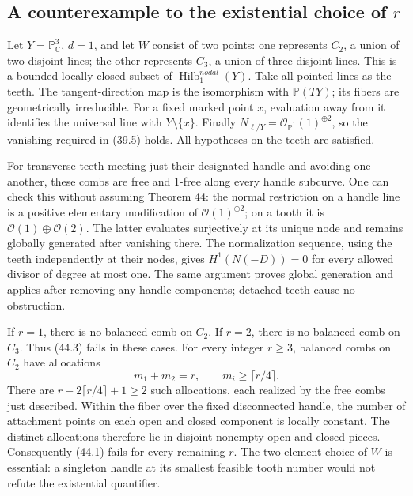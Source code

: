 \documentclass[10pt]{article}
\begin{document}
\subsection*{A counterexample to the existential choice of \(r\)}
Let \(Y=\mathbb P^3_{\mathbb C}\), \(d=1\), and let \(W\) consist of two points: one represents \(C_2\), a union of two disjoint lines; the other represents \(C_3\), a union of three disjoint lines. This is a bounded locally closed subset of \(\operatorname{Hilb}^{nodal}_1(Y)\). Take all pointed lines as the teeth. The tangent-direction map is the isomorphism with \(\mathbb P(TY)\); its fibers are geometrically irreducible. For a fixed marked point \(x\), evaluation away from it identifies the universal line with \(Y\setminus\{x\}\). Finally \(N_{\ell/Y}=\mathcal O_{\mathbb P^1}(1)^{\oplus2}\), so the vanishing required in (39.5) holds. All hypotheses on the teeth are satisfied.\par
For transverse teeth meeting just their designated handle and avoiding one another, these combs are free and 1-free along every handle subcurve. One can check this without assuming Theorem 44: the normal restriction on a handle line is a positive elementary modification of \(\mathcal O(1)^{\oplus2}\); on a tooth it is \(\mathcal O(1)\oplus\mathcal O(2)\). The latter evaluates surjectively at its unique node and remains globally generated after vanishing there. The normalization sequence, using the teeth independently at their nodes, gives \(H^1(N(-D))=0\) for every allowed divisor of degree at most one. The same argument proves global generation and applies after removing any handle components; detached teeth cause no obstruction.\par
If \(r=1\), there is no balanced comb on \(C_2\). If \(r=2\), there is no balanced comb on \(C_3\). Thus (44.3) fails in these cases. For every integer \(r\geq3\), balanced combs on \(C_2\) have allocations \[m_1+m_2=r,\qquad m_i\geq \lceil r/4\rceil .\] There are \(r-2\lceil r/4\rceil+1\geq2\) such allocations, each realized by the free combs just described. Within the fiber over the fixed disconnected handle, the number of attachment points on each open and closed component is locally constant. The distinct allocations therefore lie in disjoint nonempty open and closed pieces. Consequently (44.1) fails for every remaining \(r\). The two-element choice of \(W\) is essential: a singleton handle at its smallest feasible tooth number would not refute the existential quantifier.\par
\end{document}
